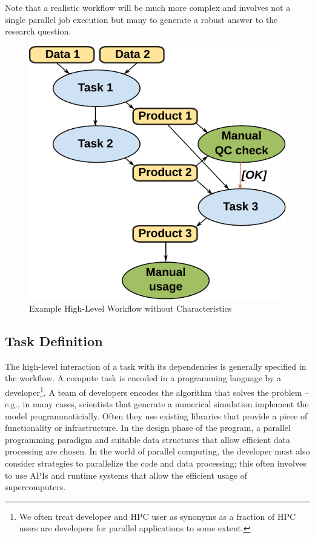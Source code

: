 \documentclass[a4paper, twocolumn]{article}
\begin{document}
Note that a realistic workflow will be much more complex and involves not a single parallel job execution but many to generate a robust answer to the research question.


\begin{figure}[b]
  \centering
  \includegraphics[width=0.75\columnwidth]{workflow}
  \caption{Example High-Level Workflow without Characteristics}
  \label{fig:workflow}
\end{figure}

\subsection{Task Definition}

The high-level interaction of a task with its dependencies is generally specified in the workflow.
A compute task is encoded in a programming language by a developer\footnote{We often treat developer and HPC user as synonyms as a fraction of HPC users are developers for parallel applications to some extent.}.
A team of developers encodes the algorithm that solves the problem -- e.g., in many cases,  scientists that generate a numerical simulation implement the model programmaticially.
Often they use existing libraries that provide a piece of functionality or infrastructure.
In the design phase of the program, a parallel programming paradigm and suitable data structures that allow efficient data processing are chosen.
In the world of parallel computing, the developer must also consider strategies to parallelize the code and data processing; this often involves to use APIs and runtime systems that allow the efficient usage of supercomputers.
\end{document}
